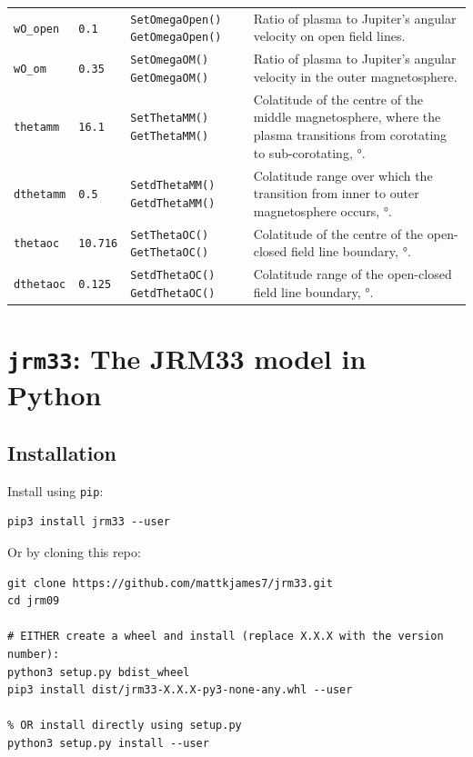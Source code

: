 \begin{tabular}{|l|l|l|p{5cm}|}
	  \texttt{wO\_open} & \texttt{0.1} & \texttt{SetOmegaOpen()} \newline \texttt{GetOmegaOpen()} & Ratio of plasma to Jupiter's angular velocity on open field lines. \\
	  \texttt{wO\_om} & \texttt{0.35} & \texttt{SetOmegaOM()} \newline \texttt{GetOmegaOM()} & Ratio of plasma to Jupiter's angular velocity in the outer magnetosphere. \\
	  \texttt{thetamm} & \texttt{16.1} & \texttt{SetThetaMM()} \newline \texttt{GetThetaMM()} & Colatitude of the centre of the middle magnetosphere, where the plasma transitions from corotating to sub-corotating, °. \\
	  \texttt{dthetamm} & \texttt{0.5} & \texttt{SetdThetaMM()} \newline \texttt{GetdThetaMM()} & Colatitude range over which the transition from inner to outer magnetosphere occurs, °. \\
	  \texttt{thetaoc} & \texttt{10.716} & \texttt{SetThetaOC()} \newline \texttt{GetThetaOC()} & Colatitude of the centre of the open-closed field line boundary, °. \\
	  \texttt{dthetaoc} & \texttt{0.125} & \texttt{SetdThetaOC()} \newline \texttt{GetdThetaOC()} & Colatitude range of the open-closed field line boundary, °. \\
	  \hline
	\end{tabular}


	\section{\texttt{jrm33}: The JRM33 model in Python}


	\subsection{Installation}

	Install using \texttt{pip}:
	
	\begin{verbatim}
pip3 install jrm33 --user
	\end{verbatim}
	
	Or by cloning this repo:
	
	\begin{verbatim}
git clone https://github.com/mattkjames7/jrm33.git
cd jrm09
	
# EITHER create a wheel and install (replace X.X.X with the version number):
python3 setup.py bdist_wheel
pip3 install dist/jrm33-X.X.X-py3-none-any.whl --user
	
% OR install directly using setup.py
python3 setup.py install --user
	\end{verbatim}
	
